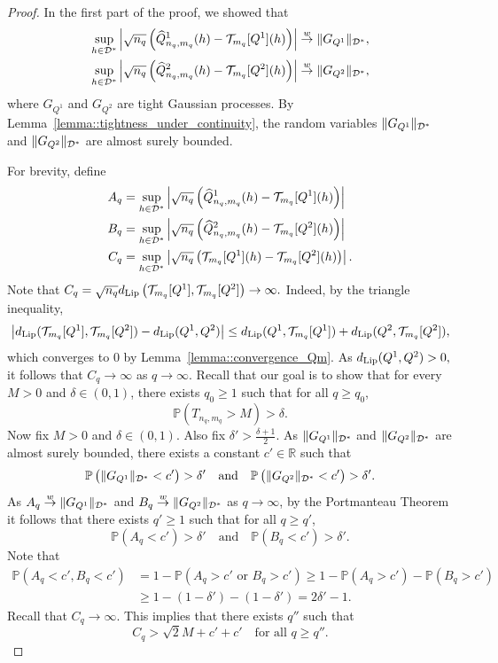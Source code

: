 \begin{proof}
In the first part of the proof, we showed that
\begin{align*}
\sup_{h \in \mathcal{D}^*}\left|\sqrt{n_q}\left(\widehat{Q}^1_{n_q,m_q}(h) - \mathcal{T}_{m_q}[Q^1](h) \right)\right|
&\overset{w}{\to} \| G_{Q^1}\|_{\mathcal{D}^*}, \\
\sup_{h \in \mathcal{D}^*}\left|\sqrt{n_q}\left(\widehat{Q}^2_{n_q,m_q}(h) - \mathcal{T}_{m_q}[Q^2](h) \right)\right|
&\overset{w}{\to} \| G_{Q^2}\|_{\mathcal{D}^*},
\end{align*}
where $G_{Q^1}$ and $G_{Q^2}$ are tight Gaussian processes. By Lemma~\ref{lemma::tightness_under_continuity}, the random variables $\| G_{Q^1} \|_{\mathcal{D}^*}$ and $\| G_{Q^2} \|_{\mathcal{D}^*}$ are almost surely bounded.

For brevity, define
\begin{align*}
A_q &= \sup_{h\in \mathcal{D}^*} \left|\sqrt{n_q}\left(\widehat{Q}^1_{n_q,m_q}(h) - \mathcal{T}_{m_q}[Q^1](h) \right)\right|\\
B_q &= \sup_{h\in \mathcal{D}^*} \left|\sqrt{n_q}\left(\widehat{Q}^2_{n_q,m_q}(h) - \mathcal{T}_{m_q}[Q^2](h) \right)\right|\\
C_q &= \sup_{h\in \mathcal{D}^*} \left| \sqrt{n_q} \left(\mathcal{T}_{m_q}[Q^1](h) - \mathcal{T}_{m_q}[Q^2](h) \right)\right|.
\end{align*}
Note that $C_q = \sqrt{n_q} d_{\mathrm{Lip}}\left(\mathcal{T}_{m_q}[Q^1],\mathcal{T}_{m_q}[Q^2]\right) \to \infty.$ Indeed, by the triangle inequality,
\[
\left| d_{\mathrm{Lip}}(\mathcal{T}_{m_q}[Q^1],\mathcal{T}_{m_q}[Q^2])  - d_{\mathrm{Lip}}(Q^{1},Q^{2})\right| \leq
d_{\mathrm{Lip}}(Q^1,\mathcal{T}_{m_q}[Q^1]) + d_{\mathrm{Lip}}(Q^2, \mathcal{T}_{m_q}[Q^2]),
\]
which converges to $0$ by Lemma~\ref{lemma::convergence_Qm}. As $d_{\mathrm{Lip}}(Q^1,Q^2) > 0,$ it follows that $C_q \to \infty$ as $q \to \infty.$ Recall that our goal is to show that for every $M > 0$ and $\delta \in (0,1)$, there exists $q_0 \geq 1$ such that for all $q \geq q_0$,
\[
\mathbb{P}\left( T_{n_q,m_q} > M\right) > \delta.
\]
Now fix $M > 0$ and $\delta \in (0,1)$. Also fix $\delta' > \frac{\delta + 1}{2}$. As $\| G_{Q^1} \|_{\mathcal{D}^*}$ and $\| G_{Q^2} \|_{\mathcal{D}^*}$ are almost surely bounded, there exists a constant $c' \in \mathbb{R}$ such that
\[
\mathbb{P} \left( \|G_{Q^1}\|_{\mathcal{D}^*} < c' \right) > \delta'
\quad \text{and} \quad
\mathbb{P} \left( \|G_{Q^2}\|_{\mathcal{D}^*} < c' \right) > \delta'.
\]
As $A_q \overset{w}{\to} \|G_{Q^1}\|_{\mathcal{D}^*}$ and $B_q \overset{w}{\to} \|G_{Q^2}\|_{\mathcal{D}^*}$ as $q \to \infty$, by the Portmanteau Theorem it follows that there exists $q' \geq 1$ such that for all $q \geq q'$,
\[
\mathbb{P}\left(A_q < c' \right) > \delta'
\quad \text{and} \quad
\mathbb{P}\left(B_q < c' \right) > \delta'.
\]
Note that
\begin{align*}
\mathbb{P}\left( A_q < c' , B_q < c'\right)
&= 1 - \mathbb{P}\left( A_q > c' \text{ or } B_q > c'\right)
\geq 1 - \mathbb{P}\left( A_q > c'\right) - \mathbb{P}\left( B_q > c'\right) \\
& \geq 1 - (1 - \delta') - (1 - \delta') = 2\delta' - 1.
\end{align*}
Recall that $C_q \to \infty$. This implies that there exists $q''$ such that
\[
C_q > \sqrt{2}M + c' + c'
\quad \text{for all } q \geq q''.
\]


\end{proof}
